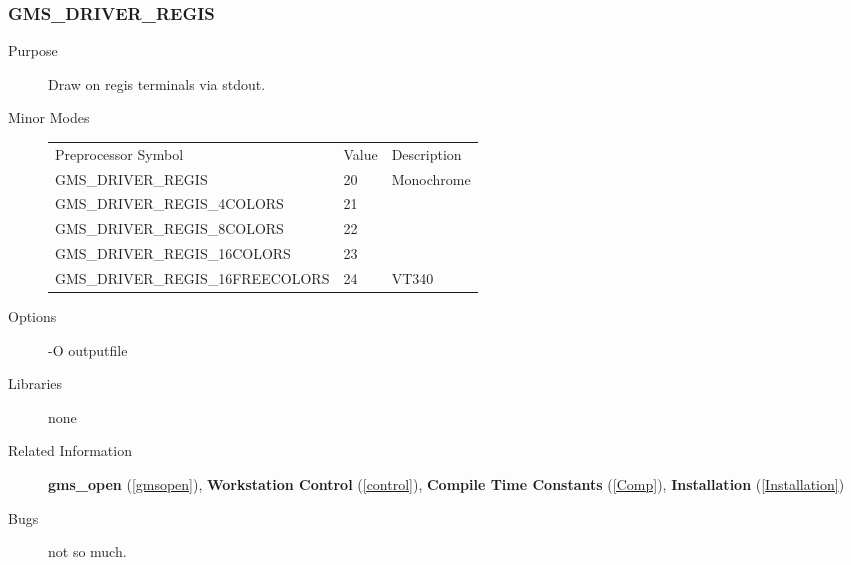 \subsubsection{GMS\_DRIVER\_REGIS\label{regis}}
\begin{description}
\item[Purpose]\mbox{}


Draw on regis terminals via stdout. 
\item[Minor Modes]\mbox{}


\begin{center}
\begin{tabular}{lll}\hline
Preprocessor Symbol & Value& Description\\ 
GMS\_DRIVER\_REGIS &  20& Monochrome\\ 
GMS\_DRIVER\_REGIS\_4COLORS &  21& \\ 
GMS\_DRIVER\_REGIS\_8COLORS &  22&  \\ 
GMS\_DRIVER\_REGIS\_16COLORS &  23&  \\ 
GMS\_DRIVER\_REGIS\_16FREECOLORS&  24& VT340\\ 
\hline\end{tabular}
\end{center}

\item[Options]\mbox{}


-O outputfile
\item[Libraries]\mbox{}


none
\item[Related Information]\mbox{}


{\bf gms\_open} (\ref{gmsopen}), 
{\bf Workstation Control} (\ref{control}), 
{\bf Compile Time Constants} (\ref{Comp}), 
{\bf Installation} (\ref{Installation}) 
\item[Bugs]\mbox{}


not so much.
\end{description}





\newpage




